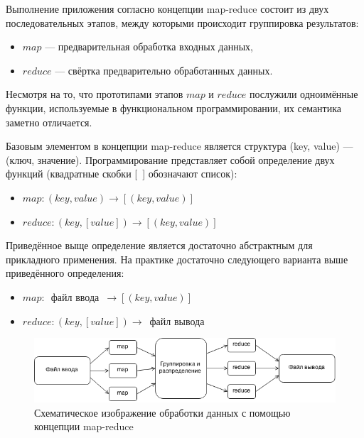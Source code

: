 \documentclass[12pt,a4paper,oneside]{extarticle}
\begin{document}
        Выполнение приложения согласно концепции map-reduce состоит из двух последовательных этапов, между которыми происходит группировка результатов:
        \begin{itemize}
            \item $map$ --- предварительная обработка входных данных,
            \item $reduce$ --- свёртка предварительно обработанных данных.
        \end{itemize}

        Несмотря на то, что прототипами этапов $map$ и $reduce$ послужили одноимённые функции, используемые в функциональном программировании, их семантика заметно отличается.

        Базовым элементом в концепции map-reduce является структура (key, value) --- (ключ, значение). Программирование представляет собой определение двух функций (квадратные скобки [~] обозначают список):
        \begin{itemize}
            \item $map: (key, value)\rightarrow[(key, value)]$
            \item $reduce: (key, [value])\rightarrow[(key, value)]$
        \end{itemize}

        Приведённое выще определение является достаточно абстрактным для прикладного применения. На практике достаточно следующего варианта выше приведённого определения:
        \begin{itemize}
            \item $map: $~файл ввода~$\rightarrow[(key, value)]$
            \item $reduce: (key, [value])\rightarrow$~файл вывода
        \end{itemize}


        \begin{figure}[h!]
                \centering
                \includegraphics[scale=0.7]{mapreduce.png}
                \caption{Схематическое изображение обработки данных с помощью концепции map-reduce}
                \label{pic:mapreduce}
        \end{figure}
\end{document}
